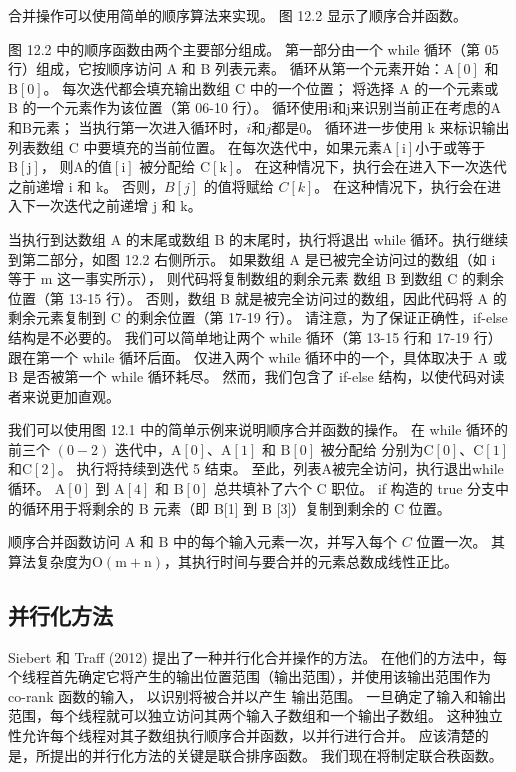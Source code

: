 合并操作可以使用简单的顺序算法来实现。 图 12.2 显示了顺序合并函数。

图 12.2 中的顺序函数由两个主要部分组成。 第一部分由一个 while 循环（第 05 行）组成，它按顺序访问 A 和 B 列表元素。 
循环从第一个元素开始：$\mathrm{A}[0]$ 和 $\mathrm{B}[0]$。 
每次迭代都会填充输出数组 C 中的一个位置； 将选择 A 的一个元素或 B 的一个元素作为该位置（第 06-10 行）。 
循环使用$\mathrm{i}$和$\mathrm{j}$来识别当前正在考虑的A和$\mathrm{B}$元素； 当执行第一次进入循环时，$i$和$j$都是0。 
循环进一步使用 $\mathrm{k}$ 来标识输出列表数组 $\mathrm{C}$ 中要填充的当前位置。 
在每次迭代中，如果元素$\mathrm{A}[\mathrm{i}]$小于或等于$\mathrm{B}[\mathrm{j}]$，
则$\mathrm{A}的值 [\mathrm{i}]$ 被分配给 $\mathrm{C}[\mathrm{k}]$。 
在这种情况下，执行会在进入下一次迭代之前递增 $\mathrm{i}$ 和 $\mathrm{k}$。 
否则，$B[j]$ 的值将赋给 $C[k]$。 在这种情况下，执行会在进入下一次迭代之前递增 $\mathrm{j}$ 和 $\mathrm{k}$。

当执行到达数组 A 的末尾或数组 B 的末尾时，执行将退出 while 循环。执行继续到第二部分，如图 12.2 右侧所示。 
如果数组 $\mathrm{A}$ 是已被完全访问过的数组（如 $\mathrm{i}$ 等于 $\mathrm{m}$ 这一事实所示），
则代码将复制数组的剩余元素 数组 B 到数组 C 的剩余位置（第 13-15 行）。 
否则，数组 B 就是被完全访问过的数组，因此代码将 A 的剩余元素复制到 C 的剩余位置（第 17-19 行）。 
请注意，为了保证正确性，if-else 结构是不必要的。 
我们可以简单地让两个 while 循环（第 13-15 行和 17-19 行）跟在第一个 while 循环后面。 
仅进入两个 while 循环中的一个，具体取决于 A 或 B 是否被第一个 while 循环耗尽。 
然而，我们包含了 if-else 结构，以使代码对读者来说更加直观。

我们可以使用图 12.1 中的简单示例来说明顺序合并函数的操作。 
在 while 循环的前三个 $(0-2)$ 迭代中，$\mathrm{A}[0]、\mathrm{A}[1]$ 和 $\mathrm{B}[0]$ 被分配给 分别为$\mathrm{C}[0]、\mathrm{C}[1]$和$\mathrm{C}[2]$。 执行将持续到迭代 5 结束。 
至此，列表$\mathrm{A}$被完全访问，执行退出while循环。 
$\mathrm{A}[0]$ 到 $\mathrm{A}[4]$ 和 $\mathrm{B}[0]$ 总共填补了六个 $\mathrm{C}$ 职位。 
if 构造的 true 分支中的循环用于将剩余的 B 元素（即 B[1] 到 $\mathrm{B}$ [3]）复制到剩余的 $\mathrm{C}$ 位置。

顺序合并函数访问 $\mathrm{A}$ 和 $\mathrm{B}$ 中的每个输入元素一次，并写入每个 $C$ 位置一次。 
其算法复杂度为$\mathrm{O}(\mathrm{m}+\mathrm{n})$，其执行时间与要合并的元素总数成线性正比。

\subsection{并行化方法}
Siebert 和 Traff (2012) 提出了一种并行化合并操作的方法。 
在他们的方法中，每个线程首先确定它将产生的输出位置范围（输出范围），并使用该输出范围作为 co-rank 函数的输入，
以识别将被合并以产生 输出范围。 一旦确定了输入和输出范围，每个线程就可以独立访问其两个输入子数组和一个输出子数组。 
这种独立性允许每个线程对其子数组执行顺序合并函数，以并行进行合并。 
应该清楚的是，所提出的并行化方法的关键是联合排序函数。 我们现在将制定联合秩函数。

